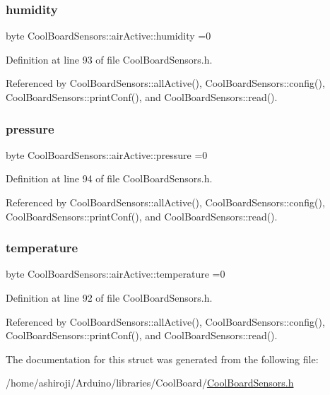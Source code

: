 \subsubsection{\texorpdfstring{humidity}{humidity}}
{\footnotesize\ttfamily byte Cool\+Board\+Sensors\+::air\+Active\+::humidity =0}



Definition at line 93 of file Cool\+Board\+Sensors.\+h.



Referenced by Cool\+Board\+Sensors\+::all\+Active(), Cool\+Board\+Sensors\+::config(), Cool\+Board\+Sensors\+::print\+Conf(), and Cool\+Board\+Sensors\+::read().

\mbox{\label{structCoolBoardSensors_1_1airActive_ab200826a70d1dc9945f5efb6b9c732ed}} 
\subsubsection{\texorpdfstring{pressure}{pressure}}
{\footnotesize\ttfamily byte Cool\+Board\+Sensors\+::air\+Active\+::pressure =0}



Definition at line 94 of file Cool\+Board\+Sensors.\+h.



Referenced by Cool\+Board\+Sensors\+::all\+Active(), Cool\+Board\+Sensors\+::config(), Cool\+Board\+Sensors\+::print\+Conf(), and Cool\+Board\+Sensors\+::read().

\mbox{\label{structCoolBoardSensors_1_1airActive_a9a6633c426b0508e30ebc1832ec6d745}} 
\subsubsection{\texorpdfstring{temperature}{temperature}}
{\footnotesize\ttfamily byte Cool\+Board\+Sensors\+::air\+Active\+::temperature =0}



Definition at line 92 of file Cool\+Board\+Sensors.\+h.



Referenced by Cool\+Board\+Sensors\+::all\+Active(), Cool\+Board\+Sensors\+::config(), Cool\+Board\+Sensors\+::print\+Conf(), and Cool\+Board\+Sensors\+::read().



The documentation for this struct was generated from the following file\+:\begin{DoxyCompactItemize}
\item 
/home/ashiroji/\+Arduino/libraries/\+Cool\+Board/\hyperlink{CoolBoardSensors_8h}{Cool\+Board\+Sensors.\+h}\end{DoxyCompactItemize}
